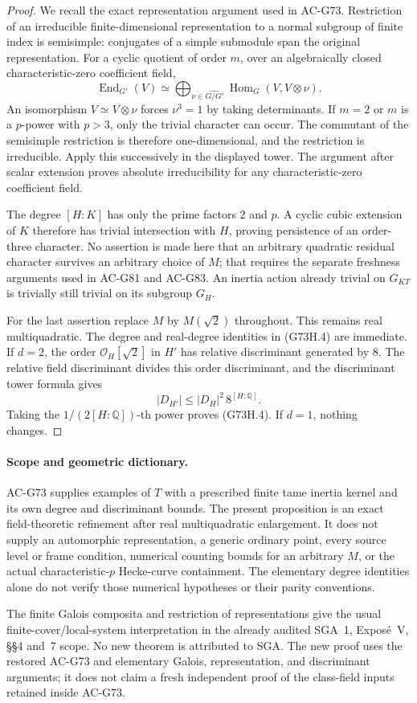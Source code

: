 \begin{proof}
We recall the exact representation argument used in AC-G73.
Restriction of an irreducible finite-dimensional representation
to a normal subgroup of finite index is semisimple: conjugates
of a simple submodule span the original representation.
For a cyclic quotient of order \(m\), over an algebraically
closed characteristic-zero coefficient field,
\[
 \operatorname{End}_{G'}(V)
   \simeq
   \bigoplus_{\nu\in\widehat{G/G'}}
             \operatorname{Hom}_{G}(V,V\otimes\nu).
 \tag{G73H.7}
\]
An isomorphism \(V\simeq V\otimes\nu\) forces
\(\nu^3=1\) by taking determinants.  If \(m=2\) or \(m\) is a
\(p\)-power with \(p>3\), only the trivial character can occur.
The commutant of the semisimple restriction is therefore
one-dimensional, and the restriction is irreducible.
Apply this successively in the displayed tower.
The argument after scalar extension proves absolute
irreducibility for any characteristic-zero coefficient field.

The degree \([H:K]\) has only the prime factors \(2\) and \(p\).
A cyclic cubic extension of \(K\) therefore has trivial
intersection with \(H\), proving persistence of an order-three
character.  No assertion is made here that an arbitrary
quadratic residual character survives an arbitrary choice of
\(M\); that requires the separate freshness arguments used in
AC-G81 and AC-G83.
An inertia action already trivial on \(G_{KT}\) is trivially
still trivial on its subgroup \(G_H\).

For the last assertion replace \(M\) by \(M(\sqrt2)\) throughout.
This remains real multiquadratic.  The degree and real-degree
identities in (G73H.4) are immediate.
If \(d=2\), the order
\(\mathcal O_H[\sqrt2]\) in \(H'\) has relative discriminant
generated by \(8\).  The relative field discriminant divides
this order discriminant, and the discriminant tower formula gives
\[
 |D_{H'}|\leq |D_H|^2\,8^{[H:\mathbb Q]}.
\]
Taking the \(1/(2[H:\mathbb Q])\)-th power proves (G73H.4).
If \(d=1\), nothing changes.
\end{proof}

\paragraph{Scope and geometric dictionary.}
AC-G73 supplies examples of \(T\) with a prescribed finite tame
inertia kernel and its own degree and discriminant bounds.
The present proposition is an exact field-theoretic refinement
after real multiquadratic enlargement.  It does not supply an
automorphic representation, a generic ordinary point, every
source level or frame condition, numerical counting bounds for
an arbitrary \(M\), or the actual characteristic-\(p\) Hecke-curve
containment.  The elementary degree identities alone do not
verify those numerical hypotheses or their parity conventions.

The finite Galois composita and restriction of representations
give the usual finite-cover/local-system interpretation in the
already audited SGA~1, Expos\'e~V, \S\S4 and~7 scope.
No new theorem is attributed to SGA.
The new proof uses the restored AC-G73 and elementary
Galois, representation, and discriminant arguments; it does not
claim a fresh independent proof of the class-field inputs
retained inside AC-G73.
